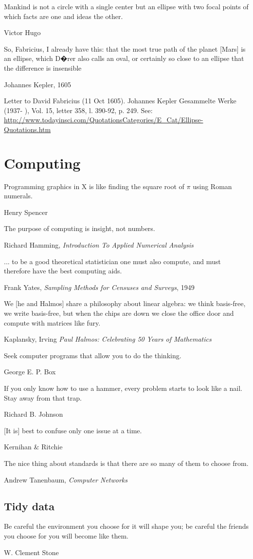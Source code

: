 \epigraph{Mankind is not a circle with a single center but an ellipse with two focal points of which facts are one and ideas the other.}{Victor Hugo}

\epigraph{So, Fabricius, I already have this: that the most true path of the planet [Mars] is an ellipse, which D�rer also calls an oval, or certainly so close to an ellipse that the difference is insensible}{Johannes Kepler, 1605}

Letter to David Fabricius (11 Oct 1605). Johannes Kepler Gesammelte Werke (1937- ), Vol. 15, letter 358, l. 390-92, p. 249.
See: \url{http://www.todayinsci.com/QuotationsCategories/E_Cat/Ellipse-Quotations.htm}


\section{Computing}

\epigraph{Programming graphics in X is like finding the square root of $\pi$ using Roman numerals.}{Henry Spencer}

\epigraph{The purpose of computing is insight, not numbers.}{Richard Hamming, \emph{Introduction To Applied Numerical Analysis}}

\epigraph{... to be a good theoretical statistician one must also compute, and must therefore have the best computing aids.}{Frank Yates, \emph{Sampling Methods for Censuses and Surveys}, 1949}

\epigraph{We [he and Halmos] share a philosophy about linear algebra: we think basis-free, we write basis-free, but when the chips are down we close the office door and compute with matrices like fury.}{Kaplansky, Irving \emph{Paul Halmos: Celebrating 50 Years of Mathematics}}

\epigraph{Seek computer programs that allow you to do the thinking.}{George E. P. Box}

\epigraph{If you only know how to use a hammer, every problem starts to look like a nail.  Stay away from that trap.}{Richard B. Johnson}

\epigraph{[It is] best to confuse only one issue at a time.}{Kernihan \& Ritchie}

\epigraph{The nice thing about standards is that there are so many of them to choose from.}{Andrew Tanenbaum, \emph{Computer Networks}}


\subsection{Tidy data}
\epigraph{Be careful the environment you choose for it will shape you; be careful the friends you choose for you will become like them.}{W. Clement Stone}

